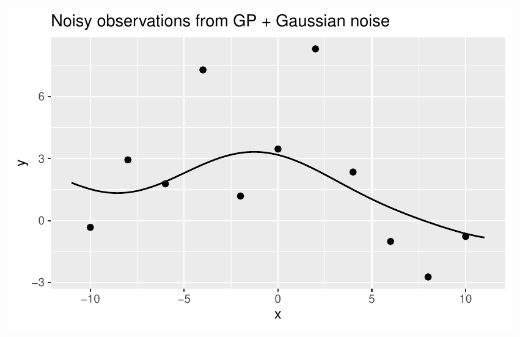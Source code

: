 \documentclass[
  letterpaper,
  DIV=11,
  numbers=noendperiod]{scrartcl}
\begin{document}
\includegraphics{GP-simulation-+-inference_files/figure-pdf/unnamed-chunk-3-1.pdf}
\end{document}

